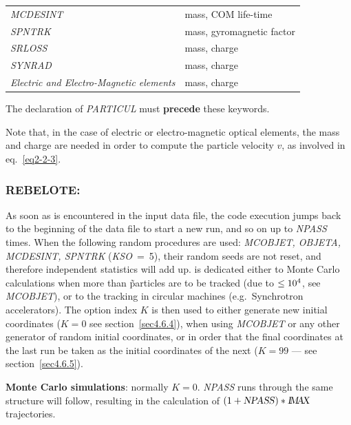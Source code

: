 \begin{tabular}{>{\sl}l!{:}l}
  MCDESINT  & mass,  COM  life-time\\
  SPNTRK    & mass,  gyromagnetic factor \\
  SRLOSS    & mass, charge \\
  SYNRAD    & mass, charge \\
  Electric and Electro-Magnetic elements
            & mass, charge 
\end{tabular}
\bigskip           

\noindent The declaration of \textsl{PARTICUL} must \textbf{precede} these keywords. 

\noindent Note that, in the case of electric or electro-magnetic 
optical elements, the mass and charge are needed in order to compute 
the particle velocity $v$, as involved in eq.~\ref{eq2-2-3}.

 \newpage

\subsubsection*{REBELOTE: \REBELOTETitl} \label{REBELOTE} 

As soon as \REBELOTE is encountered in the input data file,
the code execution jumps back to the beginning of the data file to start a new
run, and so on up to \textsl{NPASS} times. When the following random procedures 
are used: \textsl{MCOBJET, OBJETA, MCDESINT, 
SPNTRK}
\mbox{(\textsl{KSO} = 5)},
their random seeds are not reset, and therefore independent statistics 
will add up. \REBELOTE is dedicated either to Monte Carlo calculations when more 
than \imax\~particles are to be tracked (due to \mbox{\IMAX$\leq 10^4$}, 
see \textsl{MCOBJET}), 
or to the tracking in circular machines (e.g.~Synchrotron 
accelerators). The option index $ K $ is then used to either generate new 
initial coordinates ($ K=0 $ see section~\ref{sec4.6.4}), when using \textsl{MCOBJET}
 or
any other generator of random initial coordinates, or in order that the 
final coordinates at the last run be taken as the initial 
coordinates of the next  ($K=99 $ --- see section~\ref{sec4.6.5}).  
\bigskip

\noindent\textbf{Monte Carlo simulations}: normally $ K=0$.  \textsl{NPASS} runs
through the same structure will follow, resulting in the calculation of 
$(1+\text{\textsl{NPASS}})  \ast  \text{\ensuremath{\textsl{I\!M\!A\!X }}}$ trajectories.  
\bigskip

